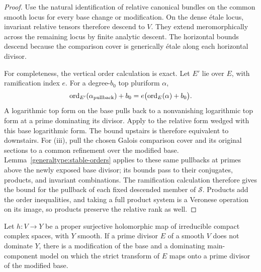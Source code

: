 \begin{proof}
Use the natural identification of relative canonical bundles on the
common smooth locus for every base change or modification.  On the
dense étale locus, invariant relative
tensors therefore descend to \(V\).  They extend meromorphically
across the remaining locus by finite analytic descent.  The
horizontal bounds descend because the comparison cover is
generically étale along each horizontal divisor.

For completeness, the vertical order calculation is exact.
Let \(E'\) lie over \(E\), with ramification index \(e\).
For a degree-\(b_0\) top pluriform \(\alpha\),
\begin{equation}\label{generaltype:ramified-order}
  \operatorname{ord}_{E'}(\alpha_{\mathrm{pullback}})+b_0
       =e\bigl(\operatorname{ord}_E(\alpha)+b_0\bigr).
\end{equation}
A logarithmic top form on the base pulls back to a nonvanishing
logarithmic top form at a prime dominating its divisor.
Apply  to the relative form
wedged with this base logarithmic form.
The bound upstairs is therefore equivalent to
 downstairs.
For (iii), pull the chosen Galois comparison cover and its original
sections to a common refinement over the modified base.
Lemma~\ref{generaltype:stable-orders} applies to these same pullbacks
at primes above the newly exposed base divisor; its bounds pass to
their conjugates, products, and invariant combinations.  The
ramification calculation therefore gives the bound for the pullback
of each fixed descended member of $\mathcal S$.
Products add the order inequalities, and taking a full product system
is a Veronese operation on its image, so products preserve the relative
rank as well.
\end{proof}

\begin{lemma}\label{generaltype:expose-valuation}
Let \(h\colon V\to Y\) be a proper surjective holomorphic map
of irreducible compact complex spaces, with \(Y\) smooth.
If a prime divisor \(E\) of a smooth \(V\) does not dominate \(Y\),
there is a modification of the base and a dominating main-component
model on which the strict transform of \(E\) maps onto a prime
divisor of the modified base.
\end{lemma}

